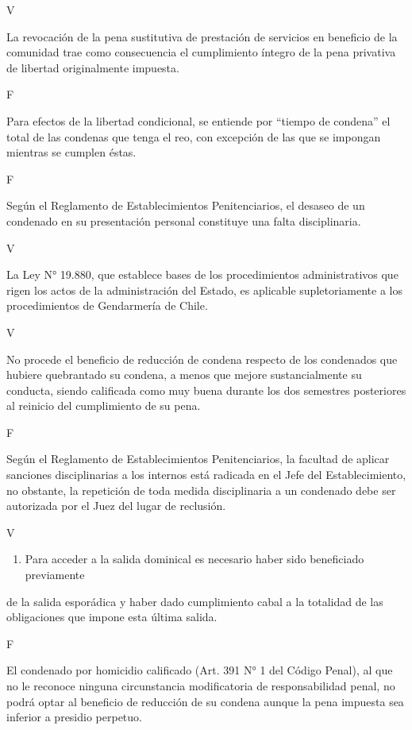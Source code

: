 \documentclass[letterpaper, 11pt]{article}
\begin{document}
V

La revocación de la pena sustitutiva de prestación de servicios en beneficio de la
comunidad trae como consecuencia el cumplimiento íntegro de la pena privativa
de libertad originalmente impuesta.

F

Para efectos de la libertad condicional, se entiende por “tiempo de condena” el
total de las condenas que tenga el reo, con excepción de las que se impongan
mientras se cumplen éstas.

F

Según el Reglamento de Establecimientos Penitenciarios, el desaseo de un
condenado en su presentación personal constituye una falta disciplinaria.

V

La Ley N° 19.880, que establece bases de los procedimientos administrativos que
rigen los actos de la administración del Estado, es aplicable supletoriamente a los
procedimientos de Gendarmería de Chile.

V

No procede el beneficio de reducción de condena respecto de los condenados que
hubiere quebrantado su condena, a menos que mejore sustancialmente su
conducta, siendo calificada como muy buena durante los dos semestres
posteriores al reinicio del cumplimiento de su pena.

F

Según el Reglamento de Establecimientos Penitenciarios, la facultad de aplicar
sanciones disciplinarias a los internos está radicada en el Jefe del Establecimiento,
no obstante, la repetición de toda medida disciplinaria a un condenado debe ser
autorizada por el Juez del lugar de reclusión.

V

\begin{enumerate}
\item Para acceder a la salida dominical es necesario haber sido beneficiado previamente
\end{enumerate}
de la salida esporádica y haber dado cumplimiento cabal a la totalidad de las
obligaciones que impone esta última salida.

F

El condenado por homicidio calificado (Art. 391 N° 1 del Código Penal), al que no le
reconoce ninguna circunstancia modificatoria de responsabilidad penal, no podrá
optar al beneficio de reducción de su condena aunque la pena impuesta sea
inferior a presidio perpetuo.
\end{document}
